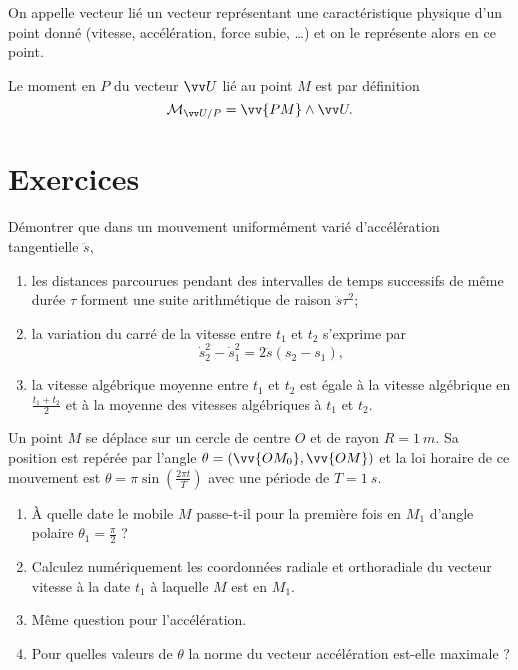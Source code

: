 On appelle vecteur lié un vecteur représentant une caractéristique physique d'un point donné (vitesse, accélération, force subie, \ldots) et on le représente alors en ce point.

Le moment en $P$ du vecteur $\vU$ lié au point $M$ est par définition
\begin{equation}
  \Mom{P}{\vU}=\vv{PM}\wedge\vU.
\end{equation}

\section{Exercices}
\label{chap1-sec:exercices}
\begin{exercice}
  Démontrer que dans un mouvement uniformément varié d'accélération tangentielle $\ddot{s}$,
  \begin{enumerate}
  \item les distances parcourues pendant des intervalles de temps successifs de même durée $\tau$ forment une suite arithmétique de raison $\ddot{s}\tau^2$;
  \item la variation du carré de la vitesse entre $t_1$ et $t_2$ s'exprime par
    \begin{equation}
      \dot{s}_2^2-\dot{s}_1^2 = 2 \ddot{s}(s_2-s_1),
    \end{equation}
  \item la vitesse algébrique moyenne entre $t_1$ et $t_2$ est égale à la vitesse algébrique en $\frac{t_1+t_2}{2}$ et à la moyenne des vitesses algébriques à $t_1$ et $t_2$.
  \end{enumerate}
\end{exercice}
%
\begin{exercice}
  Un point $M$ se déplace sur un cercle de centre $O$ et de rayon $R=\SI{1}{m}$. Sa position est repérée par l'angle $\theta=(\vv{OM_0},\vv{OM})$ et la loi horaire de ce mouvement est $\theta=\pi\sin\left(\frac{2\pi t}{T}\right)$ avec une période de $T=\SI{1}{s}$.
  \begin{enumerate}
  \item À quelle date le mobile $M$ passe-t-il pour la première fois en $M_1$ d'angle polaire $\theta_1=\frac{\pi}{2}$ ?
  \item Calculez numériquement les coordonnées radiale et orthoradiale du vecteur vitesse à la date $t_1$ à laquelle $M$ est en $M_1$.
  \item Même question pour l'accélération.
  \item Pour quelles valeurs de $\theta$ la norme du vecteur accélération est-elle maximale ?
  \end{enumerate}
\end{exercice}
